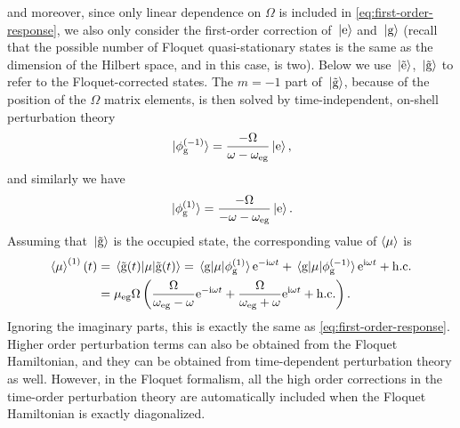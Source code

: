 \documentclass[hyperref, a4paper]{article}
\newcommand*{\ii}{\mathrm{i}}
\newcommand*{\ee}{\mathrm{e}}
\newcommand*{\omegaeg}{\omega_{\text{eg}}}
\newcommand*{\mueg}{\mu_{\text{eg}}}
\begin{document}
and moreover, since only linear dependence on $\Omega$ is included in \eqref{eq:first-order-response},
we also only consider the first-order correction of $\ket*{\text{e}}$ and $\ket*{\text{g}}$
(recall that the possible number of Floquet quasi-stationary states 
is the same as the dimension of the Hilbert space, 
and in this case, is two).
Below we use $\ket*{\tilde{\text{e}}}$, $\ket*{\tilde{\text{g}}}$
to refer to the Floquet-corrected states.
The $m=-1$ part of $\ket*{\tilde{\text{g}}}$, 
because of the position of the $\Omega$ matrix elements, is then solved 
by time-independent, on-shell perturbation theory
\begin{equation}
    \ket*{\phi_\text{g}^{(-1)}} = \frac{- \Omega}{\omega - \omegaeg} \ket*{\text{e}},
\end{equation}
and similarly we have 
\begin{equation}
    \ket*{\phi_{\text{g}}^{(1)}} = \frac{-\Omega}{- \omega - \omegaeg} \ket*{\text{e}}.
\end{equation}
Assuming that $\ket*{\tilde{\text{g}}}$ is the occupied state,
the corresponding value of $\expval{\mu}$ is 
\begin{equation}
    \begin{aligned}
        \expval{\mu}^{(1)}(t) &= \expval*{\mu}{\tilde{\text{g}}(t)}
        = \mel*{\text{g}}{\mu}{\phi_\text{g}^{(1)}} \ee^{- \ii \omega t} 
        + \mel*{\text{g}}{\mu}{\phi_\text{g}^{(-1)}} \ee^{ \ii \omega t} 
        + \text{h.c.} \\
        &= \mueg \Omega \left(
            \frac{\Omega}{\omegaeg - \omega} \ee^{- \ii \omega t}
            + \frac{\Omega}{\omegaeg + \omega} \ee^{\ii \omega t} + \text{h.c.}
        \right).
    \end{aligned}
\end{equation}
Ignoring the imaginary parts, this is exactly the same as \eqref{eq:first-order-response}.
Higher order perturbation terms can also be obtained from the Floquet Hamiltonian, 
and they can be obtained from time-dependent perturbation theory as well.
However, in the Floquet formalism, 
all the high order corrections in the time-order perturbation theory 
are automatically included when the Floquet Hamiltonian is exactly diagonalized.
\end{document}

